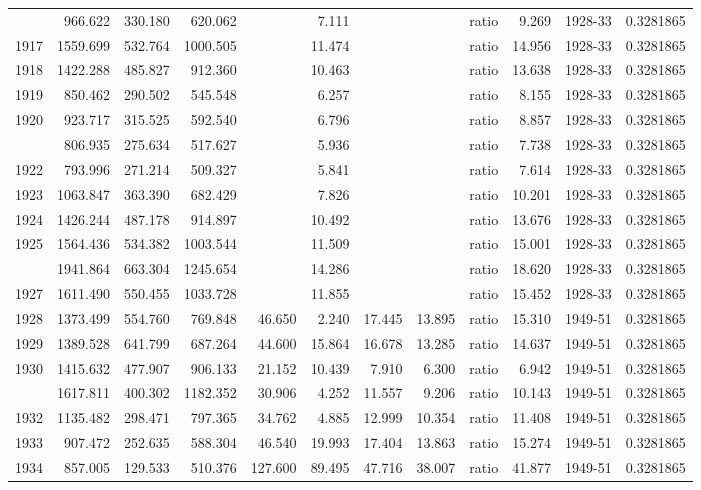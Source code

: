 \documentclass[
  english,
  a4paper,
]{article}
\begin{document}
\begin{longtable}[t]{rrrrrrrrlrlr}
\endfoot
\bottomrule
\endlastfoot
1916 & 966.622 & 330.180 & 620.062 &  & 7.111 &  &  & ratio & 9.269 & 1928-33 & 0.3281865\\
1917 & 1559.699 & 532.764 & 1000.505 &  & 11.474 &  &  & ratio & 14.956 & 1928-33 & 0.3281865\\
1918 & 1422.288 & 485.827 & 912.360 &  & 10.463 &  &  & ratio & 13.638 & 1928-33 & 0.3281865\\
1919 & 850.462 & 290.502 & 545.548 &  & 6.257 &  &  & ratio & 8.155 & 1928-33 & 0.3281865\\
1920 & 923.717 & 315.525 & 592.540 &  & 6.796 &  &  & ratio & 8.857 & 1928-33 & 0.3281865\\
\addlinespace
1921 & 806.935 & 275.634 & 517.627 &  & 5.936 &  &  & ratio & 7.738 & 1928-33 & 0.3281865\\
1922 & 793.996 & 271.214 & 509.327 &  & 5.841 &  &  & ratio & 7.614 & 1928-33 & 0.3281865\\
1923 & 1063.847 & 363.390 & 682.429 &  & 7.826 &  &  & ratio & 10.201 & 1928-33 & 0.3281865\\
1924 & 1426.244 & 487.178 & 914.897 &  & 10.492 &  &  & ratio & 13.676 & 1928-33 & 0.3281865\\
1925 & 1564.436 & 534.382 & 1003.544 &  & 11.509 &  &  & ratio & 15.001 & 1928-33 & 0.3281865\\
\addlinespace
1926 & 1941.864 & 663.304 & 1245.654 &  & 14.286 &  &  & ratio & 18.620 & 1928-33 & 0.3281865\\
1927 & 1611.490 & 550.455 & 1033.728 &  & 11.855 &  &  & ratio & 15.452 & 1928-33 & 0.3281865\\
1928 & 1373.499 & 554.760 & 769.848 & 46.650 & 2.240 & 17.445 & 13.895 & ratio & 15.310 & 1949-51 & 0.3281865\\
1929 & 1389.528 & 641.799 & 687.264 & 44.600 & 15.864 & 16.678 & 13.285 & ratio & 14.637 & 1949-51 & 0.3281865\\
1930 & 1415.632 & 477.907 & 906.133 & 21.152 & 10.439 & 7.910 & 6.300 & ratio & 6.942 & 1949-51 & 0.3281865\\
\addlinespace
1931 & 1617.811 & 400.302 & 1182.352 & 30.906 & 4.252 & 11.557 & 9.206 & ratio & 10.143 & 1949-51 & 0.3281865\\
1932 & 1135.482 & 298.471 & 797.365 & 34.762 & 4.885 & 12.999 & 10.354 & ratio & 11.408 & 1949-51 & 0.3281865\\
1933 & 907.472 & 252.635 & 588.304 & 46.540 & 19.993 & 17.404 & 13.863 & ratio & 15.274 & 1949-51 & 0.3281865\\
1934 & 857.005 & 129.533 & 510.376 & 127.600 & 89.495 & 47.716 & 38.007 & ratio & 41.877 & 1949-51 & 0.3281865\\

\end{longtable}
\end{document}
